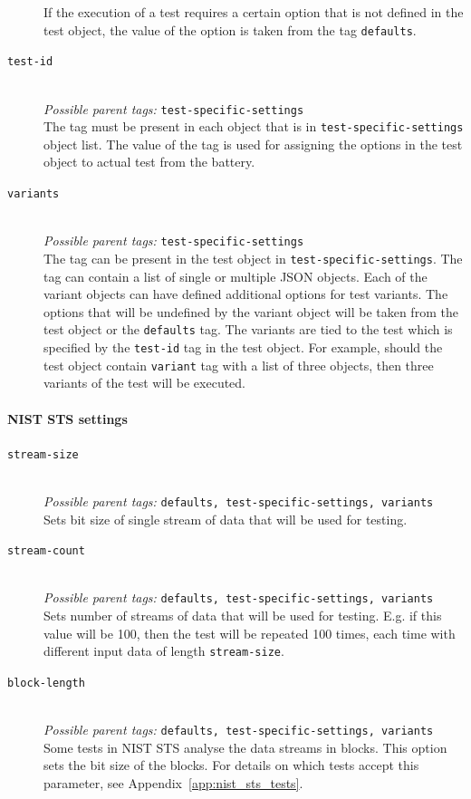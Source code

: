 \documentclass[
	digital,    %
	oneside,
	color,
	11pt,
	nocover,
	notable,
	nolof,
	nolot,
]{fithesis3}
\theoremstyle{definition}
\theoremstyle{remark}
\begin{document}
\begin{description}
If the execution of a test requires a certain option that is not defined in the test object, the value of the option is taken from the tag \texttt{defaults}.

\item[\texttt{test-id}] \hfill \\
\textit{Possible parent tags: } \texttt{test-specific-settings} \\
The tag must be present in each object that is in \texttt{test-specific-settings} object list. The value of the tag is used for assigning the options in the test object to actual test from the battery.

\item[\texttt{variants}] \hfill \\
\textit{Possible parent tags: } \texttt{test-specific-settings} \\
The tag can be present in the test object in \texttt{test-specific-settings}. The tag can contain a list of single or multiple JSON objects. Each of the variant objects can have defined additional options for test variants. The options that will be undefined by the variant object will be taken from the test object or the \texttt{defaults} tag. The variants are tied to the test which is specified by the \texttt{test-id} tag in the test object. For example, should the test object contain \texttt{variant} tag with a list of three objects, then three variants of the test will be executed.
\end{description}

\paragraph{NIST STS settings}

\begin{description}
\item[\texttt{stream-size}] \hfill \\
\textit{Possible parent tags: } \texttt{defaults, test-specific-settings, variants} \\
Sets bit size of single stream of data that will be used for testing.

\item[\texttt{stream-count}] \hfill \\
\textit{Possible parent tags: } \texttt{defaults, test-specific-settings, variants} \\
Sets number of streams of data that will be used for testing. E.g. if this value will be 100, then the test will be repeated 100 times, each time with different input data of length \texttt{stream-size}.

\item[\texttt{block-length}] \hfill \\
\textit{Possible parent tags: } \texttt{defaults, test-specific-settings, variants} \\
Some tests in NIST STS analyse the data streams in blocks. This option sets the bit size of the blocks. For details on which tests accept this parameter, see Appendix~\ref{app:nist_sts_tests}.

\end{description}
\end{document}
